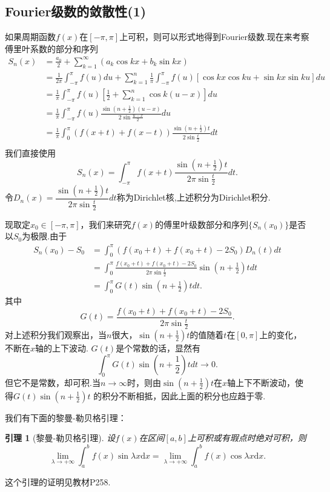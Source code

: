\documentclass[UTF8]{article}
\newcommand{\dx}{\mathrm{d}x}
\newtheorem{lem}{\hspace{2em}引理}[section]
\begin{document}
  \subsection{Fourier级数的敛散性(1)}
  如果周期函数$f(x)$在$[-\pi,\pi]$上可积，则可以形式地得到Fourier级数.现在来考察傅里叶系数的部分和序列
  \begin{align*}
    S_n(x)&=\frac{a_0}{2}+\sum_{k=1}^\infty(a_k\cos kx+b_k\sin kx)\\
    &=\frac{1}{2\pi}\int_{-\pi}^\pi f(u)du+\sum_{k=1}^n\frac{1}{\pi}\int_{-\pi}^\pi f(u)[\cos kx\cos ku+\sin kx\sin ku]du\\
    &=\frac{1}{\pi}\int_{-\pi}^\pi f(u)\left[\frac{1}{2}+\sum_{k=1}^n\cos k(u-x)\right]du\\
    &=\frac{1}{\pi}\int_{-\pi}^\pi f(u)\frac{\sin(n+\frac{1}{2})(u-x)}{2\sin\frac{u-x}{2}}du\\
    &=\frac{1}{\pi}\int_0^\pi(f(x+t)+f(x-t))\frac{\sin(n+\frac{1}{2})t}{2\sin\frac{t}{2}}dt\\
  \end{align*}
  我们直接使用
  $$S_n(x)=\int_{-\pi}^\pi f(x+t)\dfrac{\sin(n+\frac{1}{2})t}{2\pi\sin\frac{t}{2}}dt.$$
  令$D_n(x)=\dfrac{\sin(n+\frac{1}{2})t}{2\pi\sin\frac{t}{2}}dt$称为Dirichlet核,上述积分为Dirichlet积分.

  现取定$x_0\in[-\pi,\pi]$，我们来研究$f(x)$的傅里叶级数部分和序列$\{S_n(x_0)\}$是否以$S_0$为极限.由于
  \begin{align*}
    S_n(x_0)-S_0&=\int_0^\pi(f(x_0+t)+f(x_0+t)-2S_0)D_n(t)dt\\
    &=\int_0^\pi\frac{f(x_0+t)+f(x_0+t)-2S_0}{2\pi\sin\frac{t}{2}}\sin(n+\frac{1}{2})tdt\\
    &=\int_0^\pi G(t)\sin(n+\frac{1}{2})tdt.
  \end{align*}
  其中
  $$G(t)=\frac{f(x_0+t)+f(x_0+t)-2S_0}{2\pi\sin\frac{t}{2}}.$$
  对上述积分我们观察出，当$n$很大，$\sin(n+\frac{1}{2})t$的值随着$t$在$[0,\pi]$上的变化，不断在$x$轴的上下波动.
  $G(t)$是个常数的话，显然有
  $$\int_0^\pi G(t)\sin(n+\frac{1}{2})tdt\to 0.$$
  但它不是常数，却可积.当$n\to\infty$时，则由$\sin(n+\frac{1}{2})t$在$x$轴上下不断波动，使得$G(t)\sin(n+\frac{1}{2})t$
  的积分不断相抵，因此上面的积分也应趋于零.

  我们有下面的黎曼-勒贝格引理：
  \begin{lem}[黎曼-勒贝格引理]
    设$f(x)$在区间$[a,b]$上可积或有瑕点时绝对可积，则
    $$\lim_{\lambda\to+\infty}\int_a^bf(x)\sin \lambda x\dx=\lim_{\lambda\to+\infty}\int_a^bf(x)\cos\lambda x\dx.$$
  \end{lem}
  这个引理的证明见教材P258.
\end{document}
